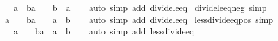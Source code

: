 \begin{isabellebody}
\ \ {\isachardoublequoteopen}{}\ {\isacharless}{\kern0pt}\ a\ {\isasymLongrightarrow}\ {\isacharparenleft}{\kern0pt}b{\isacharslash}{\kern0pt}a\ {\isasymle}\ {}{\isacharparenright}{\kern0pt}\ {\isacharequal}{\kern0pt}\ {\isacharparenleft}{\kern0pt}b\ {\isasymle}\ a{\isacharparenright}{\kern0pt}{\isachardoublequoteclose}\isanewline
%
\isadelimproof
\ \ %
\endisadelimproof
%
\isatagproof
{}\isamarkupfalse%
\ {\isacharparenleft}{\kern0pt}auto\ simp\ add{\isacharcolon}{\kern0pt}\ divide{\isacharunderscore}{\kern0pt}le{\isacharunderscore}{\kern0pt}eq{\isacharparenright}{\kern0pt}%
\endisatagproof
{\isafoldproof}%
%
\isadelimproof
\isanewline
%
\endisadelimproof
\isanewline
{}\isamarkupfalse%
\ divide{\isacharunderscore}{\kern0pt}le{\isacharunderscore}{\kern0pt}eq{\isacharunderscore}{\kern0pt}{}{\isacharunderscore}{\kern0pt}neg\ {\isacharbrackleft}{\kern0pt}simp{\isacharbrackright}{\kern0pt}{\isacharcolon}{\kern0pt}\isanewline
\ \ {\isachardoublequoteopen}a\ {\isacharless}{\kern0pt}\ {}\ {\isasymLongrightarrow}\ {\isacharparenleft}{\kern0pt}b{\isacharslash}{\kern0pt}a\ {\isasymle}\ {}{\isacharparenright}{\kern0pt}\ {\isacharequal}{\kern0pt}\ {\isacharparenleft}{\kern0pt}a\ {\isasymle}\ b{\isacharparenright}{\kern0pt}{\isachardoublequoteclose}\isanewline
%
\isadelimproof
\ \ %
\endisadelimproof
%
\isatagproof
{}\isamarkupfalse%
\ {\isacharparenleft}{\kern0pt}auto\ simp\ add{\isacharcolon}{\kern0pt}\ divide{\isacharunderscore}{\kern0pt}le{\isacharunderscore}{\kern0pt}eq{\isacharparenright}{\kern0pt}%
\endisatagproof
{\isafoldproof}%
%
\isadelimproof
\isanewline
%
\endisadelimproof
\isanewline
{}\isamarkupfalse%
\ less{\isacharunderscore}{\kern0pt}divide{\isacharunderscore}{\kern0pt}eq{\isacharunderscore}{\kern0pt}{}{\isacharunderscore}{\kern0pt}pos\ {\isacharbrackleft}{\kern0pt}simp{\isacharbrackright}{\kern0pt}{\isacharcolon}{\kern0pt}\isanewline
\ \ {\isachardoublequoteopen}{}\ {\isacharless}{\kern0pt}\ a\ {\isasymLongrightarrow}\ {\isacharparenleft}{\kern0pt}{}\ {\isacharless}{\kern0pt}\ b{\isacharslash}{\kern0pt}a{\isacharparenright}{\kern0pt}\ {\isacharequal}{\kern0pt}\ {\isacharparenleft}{\kern0pt}a\ {\isacharless}{\kern0pt}\ b{\isacharparenright}{\kern0pt}{\isachardoublequoteclose}\isanewline
%
\isadelimproof
\ \ %
\endisadelimproof
%
\isatagproof
{}\isamarkupfalse%
\ {\isacharparenleft}{\kern0pt}auto\ simp\ add{\isacharcolon}{\kern0pt}\ less{\isacharunderscore}{\kern0pt}divide{\isacharunderscore}{\kern0pt}eq{\isacharparenright}{\kern0pt}%

\end{isabellebody}
